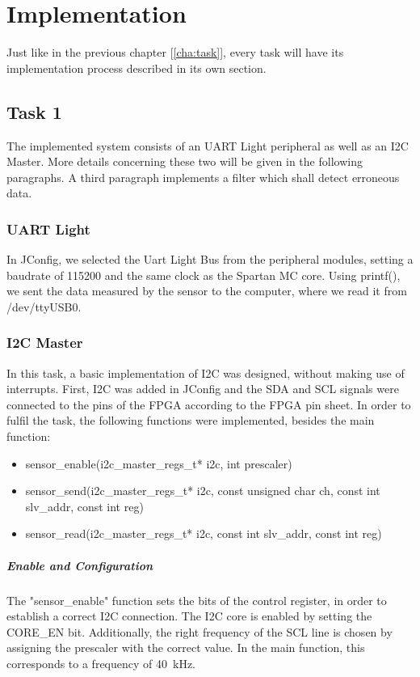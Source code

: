 \chapter{Implementation} %
\label{cha:impl}
	Just like in the previous chapter [\ref{cha:task}], every task will have its implementation process described in its own section.

	\section{Task 1} %
	\label{sec:impl_task_1}
		The implemented system consists of an UART Light peripheral as well as an I2C Master. More details concerning these two will be given in the following paragraphs. A third paragraph implements a filter which shall detect erroneous data.
	
		\subsection{UART Light} %
		\label{sub:uart_light}
			In JConfig, we selected the Uart Light Bus from the peripheral modules, setting a baudrate of 115200 and the same clock as the Spartan MC core. Using printf(), we sent the data measured by the sensor to the computer, where we read it from /dev/ttyUSB0.

		\subsection{I2C Master} %
		\label{i2c_master}
			In this task, a basic implementation of I2C was designed, without making use of interrupts. First, I2C was added in JConfig and the SDA and SCL signals were connected to the pins of the FPGA according to the FPGA pin sheet.
			In order to fulfil the task, the following functions were implemented, besides the main function:
			
			\begin{itemize}
				\item sensor\_enable(i2c\_master\_regs\_t* i2c, int prescaler)
				\item sensor\_send(i2c\_master\_regs\_t* i2c, const unsigned char ch, const int slv\_addr, const int reg)
				\item sensor\_read(i2c\_master\_regs\_t* i2c, const int slv\_addr, const int reg)
		   	\end{itemize}
			
			\paragraph{Enable and Configuration} %
	   		\label{par:enable_task1}
   				The "sensor\_enable" function sets the bits of the control register, in order to establish a correct I2C connection. The I2C core is enabled by setting the CORE\_EN bit. Additionally, the right frequency of the SCL line is chosen by assigning the prescaler with the correct value. In the main function, this corresponds to a frequency of \SI{40}{\kilo\hertz}.
				
